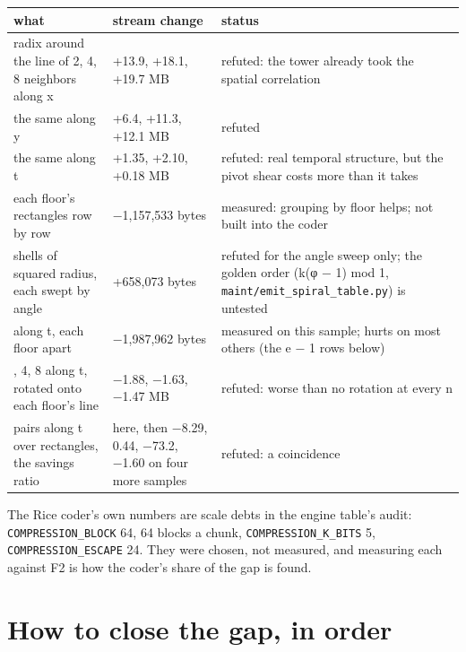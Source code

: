 {\small
\setlength{\tabcolsep}{6pt}
\begin{longtable}{>{\RaggedRight\arraybackslash}p{}>{\RaggedRight\arraybackslash}p{}>{\RaggedRight\arraybackslash}p{}}
\toprule
what & stream change & status \\
\midrule
\endhead
radix around the line of 2, 4, 8 neighbors along x & +13.9, +18.1, +19.7 MB & refuted: the tower already took the spatial correlation \\
the same along y & +6.4, +11.3, +12.1 MB & refuted \\
the same along t & +1.35, +2.10, +0.18 MB & refuted: real temporal structure, but the pivot shear costs more than it takes \\
each floor's rectangles row by row & −1,157,533 bytes & measured: grouping by floor helps; not built into the coder \\
shells of squared radius, each swept by angle & +658,073 bytes & refuted for the angle sweep only; the golden order (k(φ − 1) mod 1, \texttt{maint/\allowbreak{}emit\_\allowbreak{}spiral\_\allowbreak{}table.\allowbreak{}py}) is untested \\
2 along t, each floor apart & −1,987,962 bytes & measured on this sample; hurts on most others (the e − 1 rows below) \\
2, 4, 8 along t, rotated onto each floor's line & −1.88, −1.63, −1.47 MB & refuted: worse than no rotation at every n \\
pairs along t over rectangles, the savings ratio & 1.7174 here, then −8.29, 0.44, −73.2, −1.60 on four more samples & refuted: a coincidence \\
\bottomrule
\end{longtable}
}

The Rice coder's own numbers are scale debts in the engine table's audit: \texttt{COMPRESSION\_\allowbreak{}BLOCK} 64, 64 blocks a chunk, \texttt{COMPRESSION\_\allowbreak{}K\_\allowbreak{}BITS} 5, \texttt{COMPRESSION\_\allowbreak{}ESCAPE} 24. They were chosen, not measured, and measuring each against F2 is how the coder's share of the gap is found.

\section{\texorpdfstring{How to close the gap, in order}{How to close the gap, in order}}

